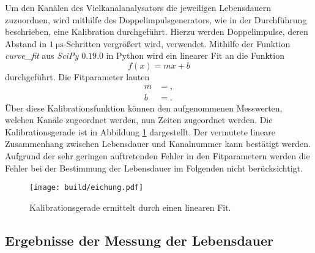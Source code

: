 Um den Kanälen des Vielkanalanalysators die jeweiligen Lebensdauern zuzuordnen, wird mithilfe des Doppelimpulsgenerators, wie in der Durchführung beschrieben, eine Kalibration durchgeführt.
Hierzu werden Doppelimpulse, deren Abstand in $\SI{1}{\micro\second}$-Schritten vergrößert wird, verwendet.
Mithilfe der Funktion \emph{curve\_fit} aus \emph{SciPy $0.19.0$} in Python \cite{scipy} wird ein linearer Fit an die Funktion
\begin{equation}
  f(x) = mx + b \label{linfit}
\end{equation}
durchgeführt.
Die Fitparameter lauten
\begin{align*}
  m &= ,\\
  b &= .
\end{align*}
Über diese Kalibrationsfunktion können den aufgenommenen Messwerten, welchen Kanäle zugeordnet werden, nun Zeiten zugeordnet werden.
Die Kalibrationsgerade ist in Abbildung \ref{plot:kali} dargestellt.
Der vermutete lineare Zusammenhang zwischen Lebensdauer und Kanalnummer kann bestätigt werden.
Aufgrund der sehr geringen auftretenden Fehler in den Fitparametern werden die Fehler bei der Bestimmung der Lebensdauer im Folgenden nicht berücksichtigt.

\begin{figure}
  \centering
  \texttt{[image: build/eichung.pdf]}
  \caption{Kalibrationsgerade ermittelt durch einen linearen Fit.}
  \label{plot:kali}
\end{figure}

\subsection{Ergebnisse der Messung der Lebensdauer}

